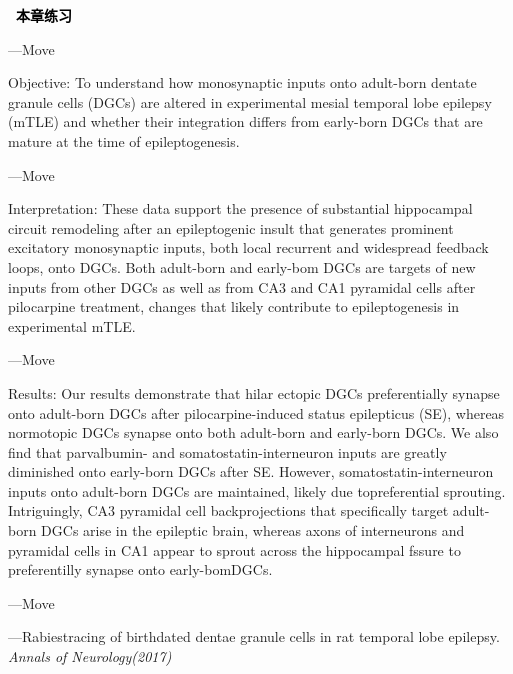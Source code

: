 \documentclass[a4paper]{ctexbook}
\newenvironment{problemset}[1][本章练习]{
  \begin{center}
    \phantomsection\addcontentsline{toc}{section}{\texorpdfstring{本章练习}{Exercice}}
    \markright{#1}
    \textcolor{black}{\Large\bfseries\adftripleflourishleft~#1~\adftripleflourishright}
  \end{center}
  \begin{enumerate}}{
  \end{enumerate}}
\begin{document}
\begin{problemset}
  \hspace*{2em}---Move \uline{\hspace*{3em}}
  
  \hspace*{2em}Objective: To understand how monosynaptic inputs onto adult-born dentate granule cells (DGCs) are altered in experimental mesial temporal lobe epilepsy (mTLE) and whether their integration differs from early-born DGCs that are mature at the time of epileptogenesis.

  \hspace*{2em}---Move \uline{\hspace*{3em}}
  
  \hspace*{2em}Interpretation: These data support the presence of substantial hippocampal circuit remodeling after an epileptogenic insult that generates prominent excitatory monosynaptic inputs, both local recurrent and widespread feedback loops, onto DGCs. Both adult-born and early-bom DGCs are targets of new inputs from other DGCs as well as from CA3 and CA1 pyramidal cells after pilocarpine treatment, changes that likely contribute to epileptogenesis in experimental mTLE.
  
  \hspace*{2em}---Move \uline{\hspace*{3em}}

  \hspace*{2em}Results: Our results demonstrate that hilar ectopic DGCs preferentially synapse onto adult-born DGCs after pilocarpine-induced status epilepticus (SE), whereas normotopic DGCs synapse onto both adult-born and early-born DGCs. We also find that parvalbumin- and somatostatin-interneuron inputs are greatly diminished onto early-born DGCs after SE. However, somatostatin-interneuron inputs onto adult-born DGCs are maintained, likely due topreferential sprouting. Intriguingly, CA3 pyramidal cell backprojections that specifically target adult-born DGCs arise in the epileptic brain, whereas axons of interneurons and pyramidal cells in CA1 appear to sprout across the hippocampal fssure to preferentilly synapse onto early-bomDGCs.

  \hspace*{2em}---Move \uline{\hspace*{3em}}

  \begin{flushright}
    ---Rabiestracing of birthdated dentae granule cells in rat temporal lobe epilepsy. \emph{Annals of Neurology(2017)}
  \end{flushright}


\end{problemset}
\end{document}
